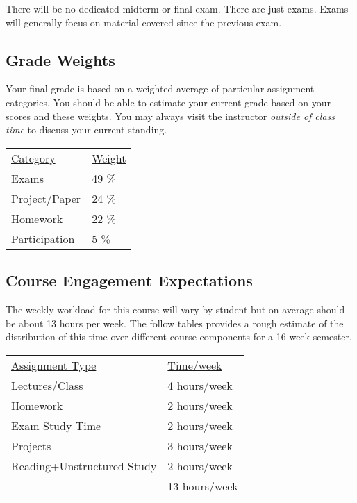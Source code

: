 \documentclass[10pt]{article}
\begin{document}
There will be no dedicated midterm or final exam. There are just exams.  Exams will generally focus on material covered since the previous exam.

\subsection{Grade Weights}

Your final grade is based on a weighted average of particular assignment categories.  You should be able to estimate your current grade based on your scores and these weights.  You may always visit the instructor \textit{outside of class time} to discuss your current standing.

\begin{center}
  \begin{tabular}{ll}
  \underline{Category} & \underline{Weight} \\
    Exams & 49 \% \\ %
    Project/Paper & 24 \% \\ %
    Homework & 22 \% \\ %
    Participation &  5 \%
  \end{tabular}
\end{center}


\subsection{Course Engagement Expectations}

The weekly workload for this course will vary by student but on average should be about 13 hours per week.  The follow tables provides a rough estimate of the distribution of this time over different course components for a 16 week semester.
\begin{center}
\begin{tabular}{ll}
\underline{Assignment Type} & \underline{Time/week} \\
Lectures/Class       & 4 hours/week \\
Homework          &  2 hours/week \\
Exam Study Time    &  2 hours/week \\
Projects          &  3 hours/week \\
Reading+Unstructured Study &  2 hours/week \\
\bottomrule
 & 13  hours/week
\end{tabular}
\end{center}
\end{document}

